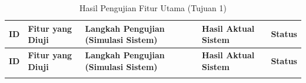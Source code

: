 \begin{longtable}{|>{\centering\arraybackslash}m{1.0cm}|p{2.3cm}|p{4.0cm}|p{4.0cm}|>{\centering\arraybackslash}m{1.2cm}|}
\caption{Hasil Pengujian Fitur Utama (Tujuan 1)} \label{tab:hasil-tujuan1} \\
\hline
\rowcolor{gray!25}
\centering\textbf{ID} & \centering\textbf{Fitur yang Diuji} & \centering\textbf{Langkah Pengujian (Simulasi Sistem)} & \centering\textbf{Hasil Aktual Sistem} & \centering\arraybackslash\textbf{Status} \\ \hline
\endfirsthead

\hline
\rowcolor{gray!25}
\centering\textbf{ID} & \centering\textbf{Fitur yang Diuji} & \centering\textbf{Langkah Pengujian (Simulasi Sistem)} & \centering\textbf{Hasil Aktual Sistem} & \centering\arraybackslash\textbf{Status} \\ \hline
\endhead

\hline
\endfoot

\hline
\endlastfoot


\end{longtable}

